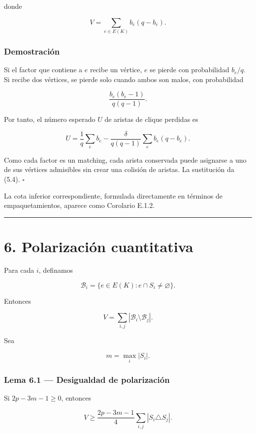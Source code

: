 \documentclass[spanish,11pt,a4paper]{article}
\begin{document}
donde

\[
V=\sum_{e\in E(K)}b_e(q-b_e).
\tag{5.5}
\]

\subsubsection{Demostración}\label{demostraciuxf3n-4}

Si el factor que contiene a \(e\) recibe un vértice, \(e\) se pierde con
probabilidad \(b_e/q\). Si recibe dos vértices, se pierde solo cuando
ambos son malos, con probabilidad

\[
\frac{b_e(b_e-1)}{q(q-1)}.
\]

Por tanto, el número esperado \(U\) de aristas de clique perdidas es

\[
U
=
\frac1q\sum_e b_e
-
\frac{\delta}{q(q-1)}\sum_e b_e(q-b_e).
\]

Como cada factor es un matching, cada arista conservada puede asignarse
a uno de sus vértices admisibles sin crear una colisión de aristas. La
sustitución da (5.4). \(\square\)

La cota inferior correspondiente, formulada directamente en términos de
empaquetamientos, aparece como Corolario E.1.2.

\begin{center}\rule{0.5\linewidth}{0.5pt}\end{center}

\section{6. Polarización
cuantitativa}\label{polarizaciuxf3n-cuantitativa}

Para cada \(i\), definamos

\[
\mathcal B_i=\{e\in E(K):e\cap S_i\ne\varnothing\}.
\]

Entonces

\[
V=\sum_{i,j}|\mathcal B_i\setminus\mathcal B_j|.
\tag{6.1}
\]

Sea

\[
m=\max_i|S_i|.
\]

\subsubsection{Lema 6.1 --- Desigualdad de
polarización}\label{lema-6.1-desigualdad-de-polarizaciuxf3n}

Si \(2p-3m-1\ge0\), entonces

\[
\boxed{
V
\ge
\frac{2p-3m-1}{4}
\sum_{i,j}|S_i\triangle S_j|
}.
\tag{6.2}
\]
\end{document}
